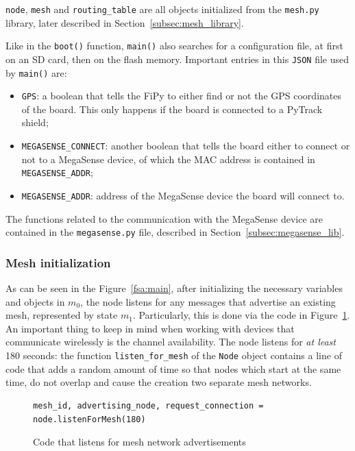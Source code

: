 				\texttt{node}, \texttt{mesh} and \texttt{routing\_table} are all objects initialized from the \texttt{mesh.py} library, later described in Section~\ref{subsec:mesh_library}.
				
				Like in the \texttt{boot()} function, \texttt{main()} also searches for a configuration file, at first on an SD card, then on the flash memory.
				Important entries in this \texttt{JSON} file used by \texttt{main()} are:
				\begin{itemize}
					\item \texttt{GPS}: a boolean that tells the FiPy to either find or not the GPS coordinates of the board. This only happens if the board is connected to a PyTrack shield;
					\item \texttt{MEGASENSE\_CONNECT}: another boolean that tells the board either to connect or not to a MegaSense device, of which the MAC address is contained in \texttt{MEGASENSE\_ADDR};
					\item \texttt{MEGASENSE\_ADDR}: address of the MegaSense device the board will connect to.
				\end{itemize}
			
				The functions related to the communication with the MegaSense device are contained in the \texttt{megasense.py} file, described in Section~\ref{subsec:megasense_lib}.
				
			\subsubsection{Mesh initialization}\label{subsec:initialization}
			
				As can be seen in the Figure~\ref{fsa:main}, after initializing the necessary variables and objects in $ m_0 $, the node listens for any messages that advertise an existing mesh, represented by state $ m_1 $.
				Particularly, this is done via the code in Figure~\ref{code:mesh_init_1}.
				An important thing to keep in mind when working with devices that communicate wirelessly is the channel availability.
				The node listens for \textit{at least} 180 seconds: the function \texttt{listen\_for\_mesh} of the \texttt{Node} object contains a line of code that adds a random amount of time so that nodes which start at the same time, do not overlap and cause the creation two separate mesh networks.
				
				\begin{figure}[H]
					\begin{lstlisting}
mesh_id, advertising_node, request_connection = node.listenForMesh(180)
					\end{lstlisting}		
					\caption{Code that listens for mesh network advertisements}
					\label{code:mesh_init_1}
				\end{figure}
			

